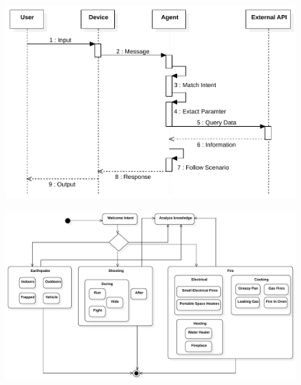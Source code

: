 \documentclass{scrreprt}
\begin{document}
\clearpage
\begin{figure}[ht!]
    \centering
    \includegraphics[angle=90, height=\textheight]{imgs/SequenceDiagram1.pdf}
    \label{fig:my_label}
\end{figure}

\clearpage

\begin{figure}[ht!]
    \centering
    \includegraphics[angle=90, height=\textheight]{imgs/StatechartDiagram1.pdf}
    \label{fig:my_label}
\end{figure}










\end{document}
